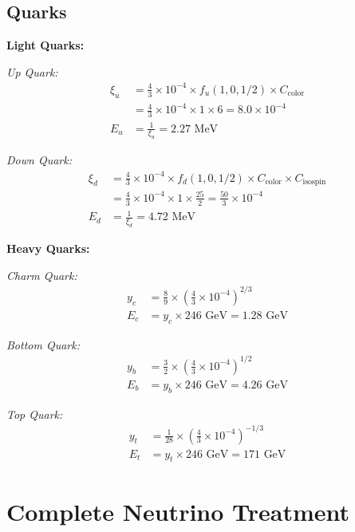 \documentclass[12pt,a4paper]{article}
\begin{document}
	\subsection{Quarks}
	\label{subsec:quarks}
	
	\textbf{Light Quarks:}
	
	\textit{Up Quark:}
	\begin{align}
		\xi_u &= \frac{4}{3} \times 10^{-4} \times f_u(1,0,1/2) \times C_{\text{color}} \\
		&= \frac{4}{3} \times 10^{-4} \times 1 \times 6 = 8.0 \times 10^{-4} \\
		E_u &= \frac{1}{\xi_u} = 2.27 \text{ MeV}
	\end{align}
	
	\textit{Down Quark:}
	\begin{align}
		\xi_d &= \frac{4}{3} \times 10^{-4} \times f_d(1,0,1/2) \times C_{\text{color}} \times C_{\text{isospin}} \\
		&= \frac{4}{3} \times 10^{-4} \times 1 \times \frac{25}{2} = \frac{50}{3} \times 10^{-4} \\
		E_d &= \frac{1}{\xi_d} = 4.72 \text{ MeV}
	\end{align}
	
	\textbf{Heavy Quarks:}
	
	\textit{Charm Quark:}
	\begin{align}
		y_c &= \frac{8}{9} \times \left(\frac{4}{3} \times 10^{-4}\right)^{2/3} \\
		E_c &= y_c \times 246 \text{ GeV} = 1.28 \text{ GeV}
	\end{align}
	
	\textit{Bottom Quark:}
	\begin{align}
		y_b &= \frac{3}{2} \times \left(\frac{4}{3} \times 10^{-4}\right)^{1/2} \\
		E_b &= y_b \times 246 \text{ GeV} = 4.26 \text{ GeV}
	\end{align}
	
	\textit{Top Quark:}
	\begin{align}
		y_t &= \frac{1}{28} \times \left(\frac{4}{3} \times 10^{-4}\right)^{-1/3} \\
		E_t &= y_t \times 246 \text{ GeV} = 171 \text{ GeV}
	\end{align}
	
	\section{Complete Neutrino Treatment}
	\label{sec:complete_neutrino_treatment}
	
\end{document}
